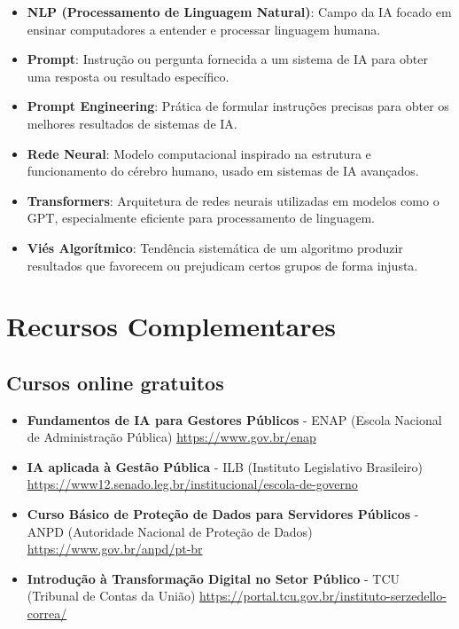 \documentclass[12pt,a4paper]{book}
\begin{document}
\begin{itemize}
    \item \textbf{NLP (Processamento de Linguagem Natural)}: Campo da IA focado em ensinar computadores a entender e processar linguagem humana.
    
    \item \textbf{Prompt}: Instrução ou pergunta fornecida a um sistema de IA para obter uma resposta ou resultado específico.
    
    \item \textbf{Prompt Engineering}: Prática de formular instruções precisas para obter os melhores resultados de sistemas de IA.
    
    \item \textbf{Rede Neural}: Modelo computacional inspirado na estrutura e funcionamento do cérebro humano, usado em sistemas de IA avançados.
    
    \item \textbf{Transformers}: Arquitetura de redes neurais utilizadas em modelos como o GPT, especialmente eficiente para processamento de linguagem.
    
    \item \textbf{Viés Algorítmico}: Tendência sistemática de um algoritmo produzir resultados que favorecem ou prejudicam certos grupos de forma injusta.
\end{itemize}

\section{Recursos Complementares}

\subsection{Cursos online gratuitos}

\begin{itemize}
    \item \textbf{Fundamentos de IA para Gestores Públicos} - ENAP (Escola Nacional de Administração Pública)
    \url{https://www.gov.br/enap}
    
    \item \textbf{IA aplicada à Gestão Pública} - ILB (Instituto Legislativo Brasileiro)
    \url{https://www12.senado.leg.br/institucional/escola-de-governo}
    
    \item \textbf{Curso Básico de Proteção de Dados para Servidores Públicos} - ANPD (Autoridade Nacional de Proteção de Dados)
    \url{https://www.gov.br/anpd/pt-br}
    
    \item \textbf{Introdução à Transformação Digital no Setor Público} - TCU (Tribunal de Contas da União)
    \url{https://portal.tcu.gov.br/instituto-serzedello-correa/}
\end{itemize}
\end{document}
